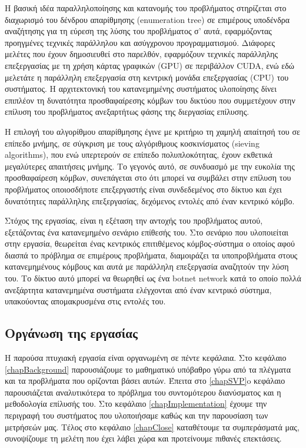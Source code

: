 Η βασική ιδέα παραλληλοποίησης και κατανομής του προβλήματος στηρίζεται στο διαχωρισμό του δένδρου απαρίθμησης (enumeration tree) σε επιμέρους υποδένδρα αναζήτησης για τη εύρεση της λύσης του προβλήματος σ' αυτά, εφαρμόζοντας προηγμένες τεχνικές παράλληλου και ασύγχρονου προγραμματισμού. Διάφορες μελέτες\cite{conf/africacrypt/HermansSBVP10} που έχουν δημοσιευθεί στο παρελθόν, εφαρμόζουν τεχνικές παράλληλης επεξεργασίας με τη χρήση κάρτας γραφικών (GPU) σε περιβάλλον CUDA, ενώ εδώ μελετάτε η παράλληλη επεξεργασία στη κεντρική μονάδα επεξεργασίας (CPU) του συστήματος. Η αρχιτεκτονική του  κατανεμημένης συστήματος υλοποίησης δίνει επιπλέον τη δυνατότητα προσθαφαίρεσης κόμβων του δικτύου που συμμετέχουν στην επίλυση του προβλήματος ανεξαρτήτως φάσης της διεργασίας επίλυσης. 

Η επιλογή του αλγορίθμου απαρίθμησης έγινε με κριτήριο τη χαμηλή απαίτησή του σε επίπεδο μνήμης, σε σύγκριση με τους αλγόριθμους κοσκινίσματος (sieving algorithms), που ενώ υπερτερούν σε επίπεδο πολυπλοκότητας, έχουν εκθετικά μεγαλύτερες απαιτήσεις μνήμης. Το γεγονός αυτό, σε συνδυασμό με την ευκολία της προσθαφαίρεση κόμβων, συνεπάγεται στο ότι μπορεί να συμβάλει στην επίλυση του προβλήματος οποιοσδήποτε επεξεργαστής είναι συνδεδεμένος στο δίκτυο και έχει δυνατότητες παράλληλης επεξεργασίας, δεχόμενος εντολές από έναν κεντρικό κόμβο.

Στόχος της εργασίας, είναι η εξέταση την αντοχής του προβλήματος αυτού, εξετάζοντας ένα κατανεμημένο σενάριο επίθεσής του. Στο σενάριο που υλοποιείται στην εργασία, θεωρείται ένας  κεντρικός επιτιθέμενος κόμβος-σύστημα ο οποίος αφού διασπά το πρόβλημα σε επιμέρους προβλήματα, διαμοιράζει τα υποπροβλήματα στους κατανεμημένους κόμβους και αυτά με παράλληλη επεξεργασία αναζητούν την λύση του. Το δίκτυο αυτό μπορεί να θεωρηθεί ως ένα botnet network κατά το οποίο πολλά ανεξάρτητα κατανεμημένα συστήματα ελέγχονται από έναν κεντρικό σύστημα, υπακούοντας απομακρυσμένα στις εντολές του.

\subsection{Οργάνωση της εργασίας}
Η παρούσα πτυχιακή εργασία είναι οργανωμένη σε πέντε κεφάλαια. Στο κεφάλαιο \ref{chapBackground} παρουσιάζουμε το μαθηματικό υπόβαθρο γύρω από τα πλέγματα και τα προβλήματα που ορίζονται βάσει αυτών. Έπειτα στο \ref{chapSVP}o κεφάλαιο παρουσιάζεται αναλυτικότερα το πρόβλημα του συντομότερου διανύσματος και η μεθοδολογία επίλυσής του. Στο κεφάλαιο \ref{chapImplementation} έχουμε την περιγραφή του συστήματος που υλοποιήσαμε καθώς και την παρουσίαση των μετρήσεών μας. Τέλος στο κεφάλαιο \ref{chapClose} καταθέτουμε τα συμπεράσματά μας, συνοψίζουμε τη μελέτη που έχει λάβει χώρα και προτείνουμε πιθανές επεκτάσεις. 
